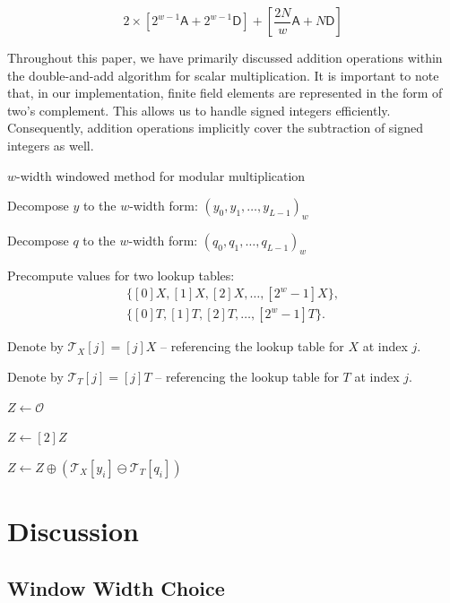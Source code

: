 \documentclass{iacrtrans}
\begin{document}
\begin{equation}
    2\times\left[2^{w-1}\mathsf{A} + 2^{w-1}\mathsf{D}\right] + \left[\frac{2N}{w} \mathsf{A} + N \mathsf{D}\right]
\end{equation}

Throughout this paper, we have primarily discussed addition operations within the double-and-add algorithm for scalar multiplication. It is important to note that, in our implementation, finite field elements are represented in the form of two's complement. This allows us to handle signed integers efficiently. Consequently, addition operations implicitly cover the subtraction of signed integers as well.

\begin{algorithm}
\caption{$w$-width windowed method for modular multiplication}


Decompose $y$ to the $w$-width form: $(y_0, y_1, \ldots, y_{L-1})_w$

Decompose $q$ to the $w$-width form: $(q_0, q_1, \ldots, q_{L-1})_w$

Precompute values for two lookup tables: 
\begin{gather*}
    \{[0]X, [1]X, [2]X, \ldots, [2^w - 1]X\}, \\
    \{[0]T, [1]T, [2]T, \ldots, [2^w - 1]T\}.
\end{gather*}

Denote by $\mathcal{T}_X[j] = [j]X$ -- referencing the lookup table for $X$ at index $j$.

Denote by $\mathcal{T}_T[j] = [j]T$ -- referencing the lookup table for $T$ at index $j$.

$Z \gets \mathcal{O}$

 {
     {
        $Z \gets [2]Z$
    }
    
    $Z \gets Z \oplus (\mathcal{T}_X[y_i] \ominus \mathcal{T}_T[q_i])$
}

\label{alg:double_multiplication}
\end{algorithm}

\section{Discussion}

\subsection{Window Width Choice}
\end{document}
